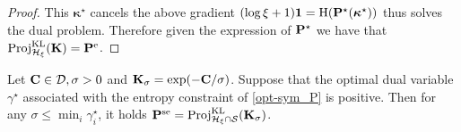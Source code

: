 \begin{proof}
This $\bm{\kappa}^\star$ cancels the above gradient \ie $(\log \xi + 1 )\bm{1} = \operatorname{H}(\mathbf{P}^\star(\bm{\kappa}^\star))$ thus solves the dual problem. Therefore given the expression of $\mathbf{P}^\star$ we have that $\operatorname{Proj}^{\operatorname{\operatorname{KL}}}_{\mathcal{H}_{\xi}}(\mathbf{K}) = \mathbf{P}^{\mathrm{e}}$.
\end{proof}

\begin{lemma}\label{lemma_sea_proj}
Let $\mathbf{C} \in \mathcal{D}, \sigma >0$ and $\mathbf{K}_\sigma = \exp(-\mathbf{C}/\sigma)$. Suppose that the optimal dual variable $\gamma^\star$ associated with the entropy constraint of \eqref{opt-sym_P} is positive. Then for any $\sigma \leq \min_i \gamma^\star_i$, it holds $\mathbf{P}^{\mathrm{se}} = \operatorname{Proj}^{\operatorname{\operatorname{KL}}}_{\mathcal{H}_{\xi} \cap
  \mathcal{S}}(\mathbf{K}_{\sigma})$.
\end{lemma}


